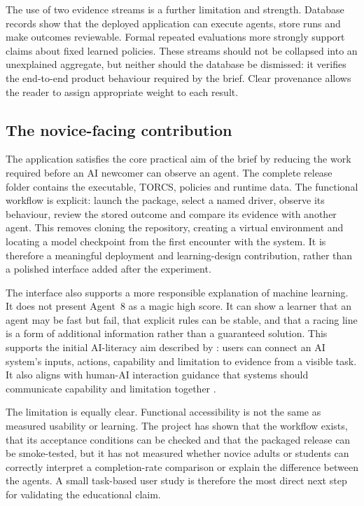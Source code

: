 The use of two evidence streams is a further limitation and strength. Database records show that the deployed application can execute agents, store runs and make outcomes reviewable. Formal repeated evaluations more strongly support claims about fixed learned policies. These streams should not be collapsed into an unexplained aggregate, but neither should the database be dismissed: it verifies the end-to-end product behaviour required by the brief. Clear provenance allows the reader to assign appropriate weight to each result.

\subsection{The novice-facing contribution}

The application satisfies the core practical aim of the brief by reducing the work required before an AI newcomer can observe an agent. The complete release folder contains the executable, TORCS, policies and runtime data. The functional workflow is explicit: launch the package, select a named driver, observe its behaviour, review the stored outcome and compare its evidence with another agent. This removes cloning the repository, creating a virtual environment and locating a model checkpoint from the first encounter with the system. It is therefore a meaningful deployment and learning-design contribution, rather than a polished interface added after the experiment.

The interface also supports a more responsible explanation of machine learning. It does not present Agent~8 as a magic high score. It can show a learner that an agent may be fast but fail, that explicit rules can be stable, and that a racing line is a form of additional information rather than a guaranteed solution. This supports the initial AI-literacy aim described by \textcite{long2020}: users can connect an AI system's inputs, actions, capability and limitation to evidence from a visible task. It also aligns with human-AI interaction guidance that systems should communicate capability and limitation together \parencite{amershi2019}.

The limitation is equally clear. Functional accessibility is not the same as measured usability or learning. The project has shown that the workflow exists, that its acceptance conditions can be checked and that the packaged release can be smoke-tested, but it has not measured whether novice adults or students can correctly interpret a completion-rate comparison or explain the difference between the agents. A small task-based user study is therefore the most direct next step for validating the educational claim.

